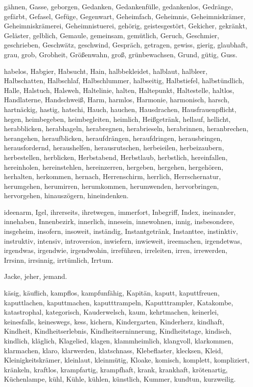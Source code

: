 \documentclass[a4paper,10pt,fleqn,twocolumn,twoside,dvipdfmx]{scrartcl}
\begin{document}
gähnen,
Gasse,
geborgen,
Gedanken,
Gedankenfülle,
gedankenlos,
Gedränge,
gefärbt,
Gefasel,
Gefüge,
Gegenwart,
Geheimfach,
Geheimnis,
Geheimniskrämer,
Geheimniskrämerei,
Geheimnistuerei,
gehörig,
geistesgestört,
Gekicher,
gekränkt,
Geläster,
gelblich,
Gemaule,
gemeinsam,
gemütlich,
Geruch,
Geschmier,
geschrieben,
Geschwätz,
geschwind,
Gespräch,
getragen,
gewiss,
gierig,
glaubhaft,
grau,
grob,
Grobheit,
Größenwahn,
groß,
grünbewachsen,
Grund,
gütig,
Guss.

habelos,
Habgier,
Habsucht,
Hain,
halbbekleidet,
halblaut,
halbleer,
Halbschatten,
Halbschlaf,
Halbschlummer,
halbseitig,
Halbstiefel,
halbstündlich,
Halle,
Halstuch,
Halsweh,
Haltelinie,
halten,
Haltepunkt,
Haltestelle,
haltlos,
Handlaterne,
Handschweiß,
Harm,
harmlos,
Harmonie,
harmonisch,
harsch,
hartnäckig,
hastig,
hatschi,
Hauch,
hauchen,
Hausdrachen,
Hausfrauenpflicht,
hegen,
heimbegeben,
heimbegleiten,
heimlich,
Heißgetränk,
hellauf,
hellicht,
herabblicken,
herabhageln,
herabregnen,
herabrieseln,
herabrinnen,
heranbrechen,
herangehen,
heraufblicken,
heraufdrängen,
heraufdringen,
herausbringen,
herausfordernd,
heraushelfen,
herausrutschen,
herbeieilen,
herbeizaubern,
herbestellen,
herblicken,
Herbstabend,
Herbstlaub,
herbstlich,
hereinfallen,
hereinholen,
hereinstehlen,
hereinzerren,
hergeben,
hergehen,
hergehören,
herhalten,
herkommen,
hernach,
Herrenschirm,
herrlich,
Herrschernatur,
herumgehen,
herumirren,
herumkommen,
herumwenden,
hervorbringen,
hervorgehen,
hinauszögern,
hineindenken.

ideenarm,
Igel,
ihrerseits,
ihretwegen,
immerfort,
Inbegriff,
Index,
ineinander,
innehaben,
Innenbezirk,
innerlich,
innesein,
innewohnen,
innig,
insbesondere,
insgeheim,
insofern,
insoweit,
inständig,
Instantgetränk,
Instanttee,
instinktiv,
instruktiv,
intensiv,
introversion,
inwiefern,
inwieweit,
ireemachen,
irgendetwas,
irgendwas,
irgendwie,
irgendwohin,
irreführen,
irreleiten,
irren,
irrewerden,
Irrsinn,
irrsinnig,
irrtümlich,
Irrtum.

Jacke,
jeher,
jemand.

käsig,
käuflich,
kampflos,
kampfunfähig,
Kapitän,
kaputt,
kaputtfreuen,
kaputtlachen,
kaputtmachen,
kaputttrampeln,
Kaputttrampler,
Katakombe,
katastrophal,
kategorisch,
Kauderwelsch,
kaum,
kehrtmachen,
keinerlei,
keinesfalls,
keineswegs,
kess,
kichern,
Kindergarten,
Kinderherz,
kindhaft,
Kindheit,
Kindheitserlebnis,
Kindheitserninnerung,
Kindheitstage,
kindisch,
kindlich,
kläglich,
Klagelied,
klagen,
klammheimlich,
klangvoll,
klarkommen,
klarmachen,
klaro,
klarwerden,
klatschnass,
Klebeflaster,
klecksen,
Kleid,
Kleinigkeitskrämer,
kleinlaut,
kleinmütig,
Kloake,
komisch,
komplett,
kompliziert,
kränkeln,
kraftlos,
krampfartig,
krampfhaft,
krank,
krankhaft,
krötenartig,
Küchenlampe,
kühl,
Kühle,
kühlen,
künstlich,
Kummer,
kundtun,
kurzweilig.
\end{document}
